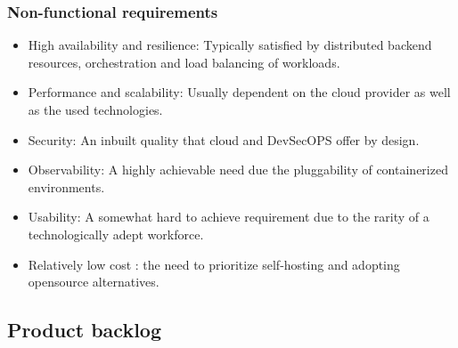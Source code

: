 \subsubsection{Non-functional requirements}

\begin{itemize}[label={--}]
\item High availability and resilience: Typically satisfied by distributed backend resources, orchestration and load balancing of workloads. 
\item Performance and scalability: Usually dependent on the cloud provider as well as the used technologies.
\item Security: An inbuilt quality that cloud and DevSecOPS offer by design.
\item Observability: A highly achievable need due the pluggability of containerized environments.
\item Usability: A somewhat hard to achieve requirement due to the rarity of a technologically adept workforce. 
\item Relatively low cost : the need to prioritize self-hosting and adopting opensource alternatives.
\end{itemize}

\newpage
\subsection{Product backlog }


